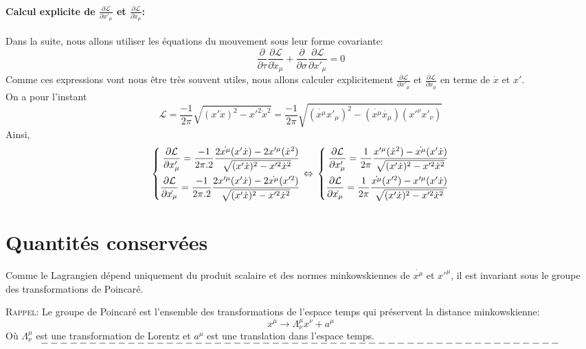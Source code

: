 \documentclass[a4paper,12pt]{article}
\def\xmu{x^\mu}
\def\CL{\mathcal{L}}
\begin{document}
\paragraph{Calcul explicite de $\frac{\partial \CL}{\partial x'_{\mu}}$ et $\frac{\partial \CL}{\partial \dot x_{\mu}}$:}
Dans la suite, nous allons utiliser les équations du mouvement sous leur forme covariante:
$$\frac{\partial}{\partial \tau}\frac{\partial \CL}{\partial \dot x_{\mu}}+\frac{\partial}{\partial \sigma}\frac{\partial \CL}{\partial  x'_{\mu}}=0$$
Comme ces expressions vont nous être très souvent utiles, nous allons calculer explicitement $\frac{\partial \CL}{\partial x'_{\mu}}$ et $\frac{\partial \CL}{\partial \dot x_{\mu}}$ en terme de $\dot{x}$ et $x'$.\\
On a pour l'instant  $$\CL=\frac{-1}{2\pi}\sqrt{(x'\dot{x})^2-x'^2\dot{x}^2}=\frac{-1}{2\pi}\sqrt{(\dot{\xmu}x'_\mu)^2-(\dot{\xmu}\dot{x_\mu})(x'^\nu x'_\nu)}$$
Ainsi,
\begin{equation}
	\left\lbrace 
	\begin{aligned}
	\frac{\partial \CL}{\partial x'_\mu }=\frac{-1}{2\pi.2}\frac{2\dot{\xmu}(x'\dot{x})-2x'^\mu (\dot{x}^2)}{\sqrt{(x'\dot{x})^2-x'^2\dot{x}^2}}\\
	\frac{\partial \CL}{\partial \dot{x_\mu}}=\frac{-1}{2\pi.2}\frac{2x'^\mu(x'\dot{x})-2\dot{\xmu} (x'^2)}{\sqrt{(x'\dot{x})^2-x'^2\dot{x}^2}}\\
	\end{aligned} 
	\right. 
	\Leftrightarrow\\
	\left\lbrace
	\begin{aligned}
	\frac{\partial \CL}{\partial x'_\mu }=\frac{1}{2\pi}\frac{x'^\mu (\dot{x}^2)-\dot{\xmu}(x'\dot{x})}{\sqrt{(x'\dot{x})^2-x'^2\dot{x}^2}}\\
	\frac{\partial \CL}{\partial \dot{x_\mu}}=\frac{1}{2\pi}\frac{\dot{\xmu} (x'^2)-x'^\mu(x'\dot{x})}{\sqrt{(x'\dot{x})^2-x'^2\dot{x}^2}}\\
	\end{aligned}
	\right.\label{mvt}
\end{equation}
\section{Quantités conservées}
Comme le Lagrangien dépend uniquement du produit scalaire et des normes minkowskiennes de $\dot{x^{\mu}}$ et $x'^{\mu}$, il est invariant sous le groupe des transformations de Poincaré.

\textsc{Rappel}: Le groupe de Poincaré est l'ensemble des transformations de l'espace temps qui préservent la distance minkowskienne:
$$ x^{\mu}\rightarrow\Lambda_{\nu}^{\mu}x^{\nu}+a^{\mu}$$ 
Où $\Lambda_{\nu}^{\mu}$ est une transformation de Lorentz et $a^{\mu}$ est une translation dans l'espace temps.\\
$$------------------------------------------------------$$
\end{document}
